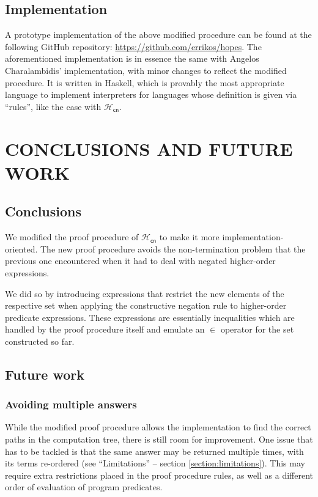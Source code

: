 \documentclass[inscr,ack,preface]{dithesis}
\theoremstyle{definition}
\newcommand{\hcn}{$\mathcal{H}_\mathsf{cn}$}
\begin{document}
\section{Implementation}
A prototype implementation of the above modified procedure can be found at the following GitHub repository: \url{https://github.com/errikos/hopes}. The aforementioned implementation is in essence the same with Angelos Charalambidis' implementation, with minor changes to reflect the modified procedure. It is written in Haskell, which is provably the most appropriate language to implement interpreters for languages whose definition is given via ``rules'', like the case with \hcn{}.

\chapter{CONCLUSIONS AND FUTURE WORK}
\label{chap:conclusion}

\section{Conclusions}
We modified the proof procedure of \hcn{} to make it more implementation-oriented. The new proof procedure avoids the non-termination problem that the previous one encountered when it had to deal with negated higher-order expressions.

We did so by introducing expressions that restrict the new elements of the respective set when applying the constructive negation rule to higher-order predicate expressions. These expressions are essentially inequalities which are handled by the proof procedure itself and emulate an $\in$ operator for the set constructed so far.

\section{Future work}
\subsection*{Avoiding multiple answers}
While the modified proof procedure allows the implementation to find the correct paths in the computation tree, there is still room for improvement. One issue that has to be tackled is that the same answer may be returned multiple times, with its terms re-ordered (see ``Limitations'' -- section \ref{section:limitations}). This may require extra restrictions placed in the proof procedure rules, as well as a different order of evaluation of program predicates.
\end{document}

